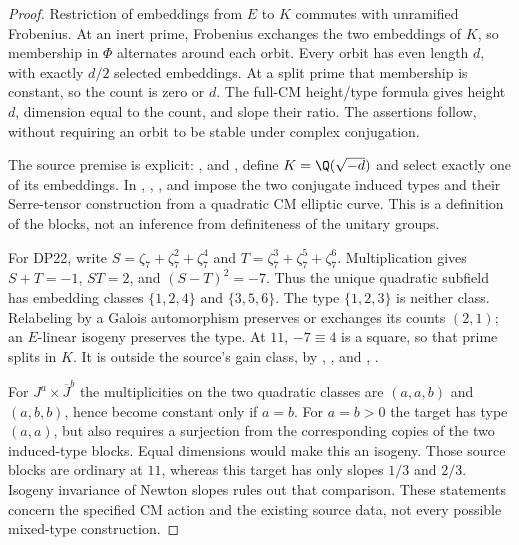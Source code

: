 \documentclass[11pt,a4paper]{article}
\theoremstyle{definition}\newtheorem{remark}[theorem]{Remark}
\begin{document}
\begin{proof}
Restriction of embeddings from $E$ to $K$ commutes with unramified Frobenius. At an inert prime, Frobenius exchanges the two embeddings of $K$, so membership in $\Phi$ alternates around each orbit. Every orbit has even length $d$, with exactly $d/2$ selected embeddings. At a split prime that membership is constant, so the count is zero or $d$. The full-CM height/type formula \cite[\S5, (10*) and Theorem 3]{Tate352} gives height $d$, dimension equal to the count, and slope their ratio. The assertions follow, without requiring an orbit to be stable under complex conjugation.

The source premise is explicit: ,  and , define $K=\Q(\sqrt{-d})$ and select exactly one of its embeddings. In , , , and  impose the two conjugate induced types and their Serre-tensor construction from a quadratic CM elliptic curve. This is a definition of the blocks, not an inference from definiteness of the unitary groups.

For DP22, write $S=\zeta_7+\zeta_7^2+\zeta_7^4$ and $T=\zeta_7^3+\zeta_7^5+\zeta_7^6$. Multiplication gives $S+T=-1$, $ST=2$, and $(S-T)^2=-7$. Thus the unique quadratic subfield has embedding classes $\{1,2,4\}$ and $\{3,5,6\}$. The type $\{1,2,3\}$ is neither class. Relabeling by a Galois automorphism preserves or exchanges its counts $(2,1)$; an $E$-linear isogeny preserves the type. At $11$, $-7\equiv4$ is a square, so that prime splits in $K$. It is outside the source's  gain class, by , , and , .

For $J^a\times\overline J^{b}$ the multiplicities on the two quadratic classes are $(a,a,b)$ and $(a,b,b)$, hence become constant only if $a=b$. For $a=b>0$ the target has type $(a,a)$, but  also requires a surjection from the corresponding copies of the two induced-type blocks. Equal dimensions would make this an isogeny. Those source blocks are ordinary at $11$, whereas this target has only slopes $1/3$ and $2/3$. Isogeny invariance of Newton slopes rules out that comparison. These statements concern the specified CM action and the existing source data, not every possible mixed-type construction.
\end{proof}
\end{document}
